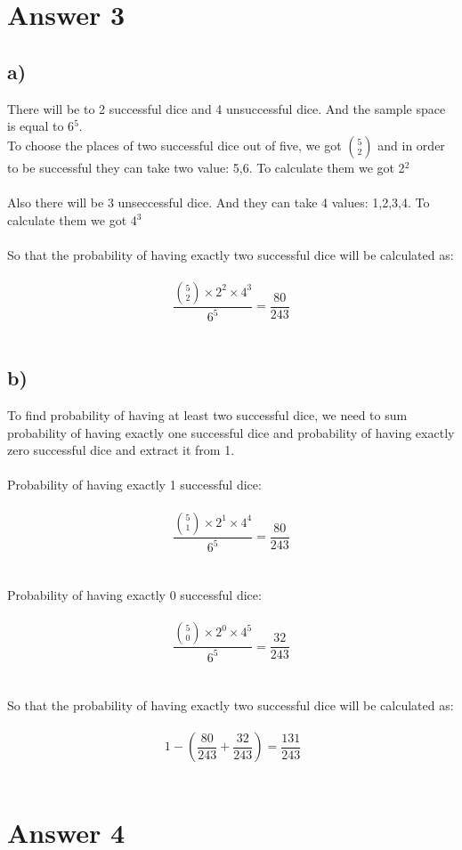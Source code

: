 \documentclass[12pt]{article}
\begin{document}
\section*{Answer 3}
\subsection*{a)}
There will be to 2 successful dice and 4 unsuccessful dice. And the sample space is equal to 6$^5$.\\
To choose the places of two successful dice out of five,  we got ${5\choose 2}$ and in order to be successful they can take two value: {5,6}. To calculate them we got 2$^2$\\
\\
Also there will be 3 unseccessful dice. And they can take 4 values: {1,2,3,4}. To calculate them we got 4$^3$\\
\\
So that the probability of having exactly two successful dice will be calculated as:\\
\\
\[\frac{{5\choose 2} \times 2^2 \times 4^3}{6^5} = \frac{80}{243} \]\\


\subsection*{b)}
To find probability of having at least two successful dice, we need to sum probability of having exactly one successful dice and probability of having exactly zero successful dice and extract it from 1.\\
\\
Probability of having exactly 1 successful dice:\\
\\
\[\frac{{5\choose 1} \times 2^1 \times 4^4}{6^5} = \frac{80}{243} \]\\
\\
Probability of having exactly 0 successful dice:\\
\\
\[\frac{{5\choose 0} \times 2^0 \times 4^5}{6^5} = \frac{32}{243} \]\\
\\
So that the probability of having exactly two successful dice will be calculated as:\\
\\
\[\ 1 -  (\frac{80}{243} + \frac{32}{243}) = \frac{131}{243} \]
\\
\section*{Answer 4}
\end{document}
